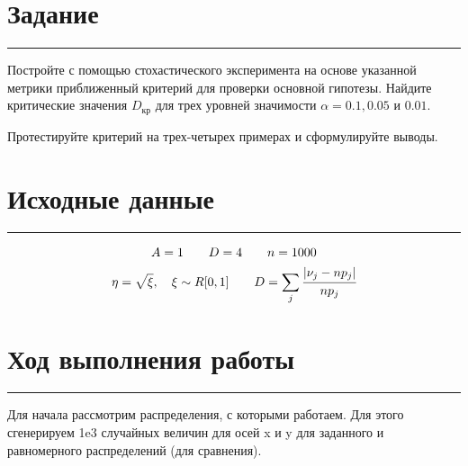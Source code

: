 \documentclass[a4paper, 14pt]{extarticle}
\begin{document}
\lstset{style=mystyle, extendedchars=\true}


\section*{Задание}\vspace{-20pt}\rule{\linewidth}{0.1mm}

Постройте с помощью стохастического эксперимента на основе указанной метрики приближенный 
критерий для проверки основной гипотезы. 
Найдите критические значения $D_{\text{кр}}$ для трех уровней значимости 
$\alpha = 0.1, 0.05 \text{ и } 0.01$.

Протестируйте критерий на трех-четырех примерах и сформулируйте выводы. 

\section*{Исходные данные}\vspace{-20pt}\rule{\linewidth}{0.1mm}

\vspace{-10pt}

\begin{gather*}
  A = 1 \qquad D = 4 \qquad n = 1000 \\
  \eta = \sqrt{\xi}, \hspace{10pt} \xi \sim R[0, 1] \qquad D = \sum_{j} \cfrac{|\nu_j - n p_j|}{n p_j}
\end{gather*}

\section*{Ход выполнения работы}\vspace{-20pt}\rule{\linewidth}{0.1mm}

Для начала рассмотрим распределения, с которыми работаем. Для этого сгенерируем 1e3 
случайных величин для осей x и y для заданного и равномерного распределений (для сравнения).
\end{document}
